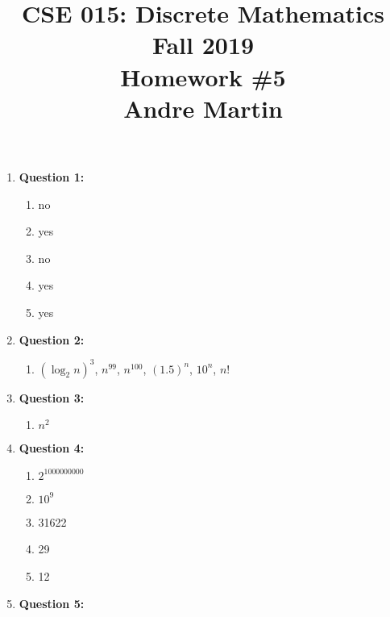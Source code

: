 \documentclass[11pt]{article}
\begin{document}
\title{\vspace{-1.5cm}CSE 015: Discrete Mathematics\\
Fall 2019\\
Homework \#5\\
Andre Martin}
\date{}
\maketitle

\vspace{-1.5cm}


\begin{enumerate}

\item
\textbf{Question 1:}

\begin{enumerate}[label=(\alph*)]
\item no
\item yes
\item no
\item yes
\item yes
\end{enumerate}

\item
\textbf{Question 2:}

\begin{enumerate}[label=(\alph*)]
\item $(\log_2 n)^3 $, $n^{99}$, $n^{100}$, $(1.5)^n$, $10^n$, $n!$
\end{enumerate}

\item
\textbf{Question 3:}

\begin{enumerate}[label=(\alph*)]
\item $n^2$
\end{enumerate}

\item
\textbf{Question 4:}

\begin{enumerate}[label=(\alph*)]
\item $2^{1000000000}$
\item $10^9$
\item 31622
\item 29
\item 12
\end{enumerate}

\item
\textbf{Question 5:}


\end{enumerate}
\end{document}

